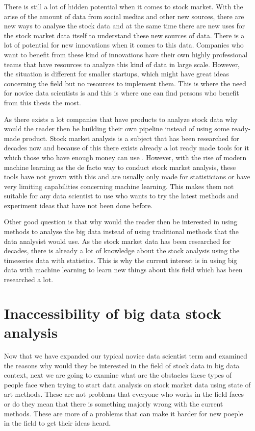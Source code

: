 There is still a lot of hidden potential when it comes to stock market.
With the arise of the amount of data from social medias and other new sources, there are new ways to analyse the stock data and at the same time there are new uses for the stock market data itself to understand these new sources of data.
There is a lot of potential for new innovations when it comes to this data.
Companies who want to benefit from these kind of innovations have their own highly professional teams that have resources to analyze this kind of data in large scale.
However, the situation is different for smaller startups, which might have great ideas concerning the field but no resources to implement them.
This is where the need for novice data scientists is and this is where one can find persons who benefit from this thesis the most.

As there exists a lot companies that have products to analyze stock data why would the reader then be building their own pipeline instead of using some ready-made product.
Stock market analysis is a subject that has been researched for decades now and because of this there exists already a lot ready made tools for it which those who have enough money can use \cite{metastock} \cite{worden}.
However, with the rise of modern machine learning as the de facto way to conduct stock market analysis, these tools have not grown with this and are usually only made for statisticians or have very limiting capabilities concerning machine learning.
This makes them not suitable for any data scientist to use who wants to try the latest methods and experiment ideas that have not been done before.

Other good question is that why would the reader then be interested in using methods to analyse the big data instead of using traditional methods that the data analysist would use.
As the stock market data has been researched for decades, there is already a lot of knowledge about the stock analysis using the timeseries data with statistics.
This is why the current interest is in using big data with machine learning to learn new things about this field which has been researched a lot.


\section{Inaccessibility of big data stock analysis}

Now that we have expanded our typical novice data scientist term and examined the reasons why would they be interested in the field of stock data in big data context, next we are going to examine what are the obstacles these types of people face when trying to start data analysis on stock market data using state of art methods.
These are not problems that everyone who works in the field faces or do they mean that there is something majorly wrong with the current methods.
These are more of a problems that can make it harder for new poeple in the field to get their ideas heard.

